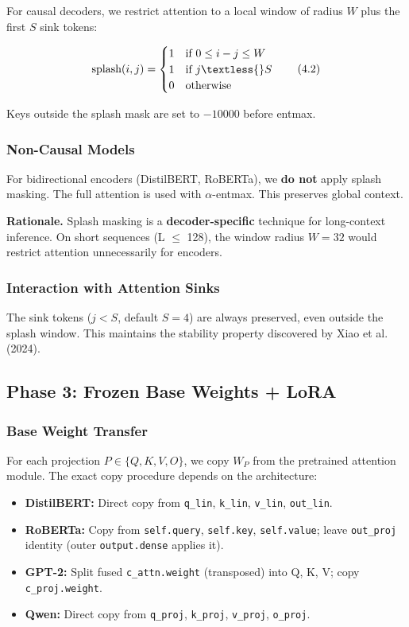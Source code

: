 For causal decoders, we restrict attention to a local window of radius $W$ 
plus the first $S$ sink tokens:

\[
\text{splash}(i, j) = \begin{cases}
1 & \text{if } 0 \leq i - j \leq W \\
1 & \text{if } j \textless{} S \\
0 & \text{otherwise}
\end{cases}
\tag{4.2}
\]

Keys outside the splash mask are set to $-10000$ before entmax.

\subsubsection{Non-Causal Models}

For bidirectional encoders (DistilBERT, RoBERTa), we \textbf{do not} apply 
splash masking. The full attention is used with $\alpha$-entmax. This preserves 
global context.

\textbf{Rationale.} Splash masking is a \textbf{decoder-specific} technique for 
long-context inference. On short sequences (L $\le$ 128), the window radius 
$W = 32$ would restrict attention unnecessarily for encoders.

\subsubsection{Interaction with Attention Sinks}

The sink tokens ($j < S$, default $S = 4$) are always preserved, even outside 
the splash window. This maintains the stability property discovered by 
Xiao et al. (2024).

\subsection{Phase 3: Frozen Base Weights + LoRA}

\subsubsection{Base Weight Transfer}

For each projection $P \in \{Q, K, V, O\}$, we copy $W_P$ from the pretrained 
attention module. The exact copy procedure depends on the architecture:

\begin{itemize}
\item \textbf{DistilBERT:} Direct copy from \texttt{q\_lin}, \texttt{k\_lin}, \texttt{v\_lin}, \texttt{out\_lin}.
\item \textbf{RoBERTa:} Copy from \texttt{self.query}, \texttt{self.key}, \texttt{self.value}; leave
  \texttt{out\_proj} identity (outer \texttt{output.dense} applies it).
\item \textbf{GPT-2:} Split fused \texttt{c\_attn.weight} (transposed) into Q, K, V; copy
  \texttt{c\_proj.weight}.
\item \textbf{Qwen:} Direct copy from \texttt{q\_proj}, \texttt{k\_proj}, \texttt{v\_proj}, \texttt{o\_proj}.

\end{itemize}
